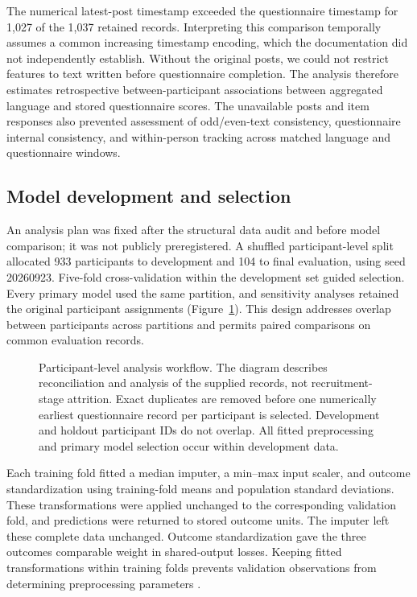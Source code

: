 The numerical latest-post timestamp exceeded the questionnaire timestamp for 1,027 of the 1,037 retained records. Interpreting this comparison temporally assumes a common increasing timestamp encoding, which the documentation did not independently establish. Without the original posts, we could not restrict features to text written before questionnaire completion. The analysis therefore estimates retrospective between-participant associations between aggregated language and stored questionnaire scores. The unavailable posts and item responses also prevented assessment of odd/even-text consistency, questionnaire internal consistency, and within-person tracking across matched language and questionnaire windows.

\subsection{Model development and selection}
An analysis plan was fixed after the structural data audit and before model comparison; it was not publicly preregistered. A shuffled participant-level split allocated 933 participants to development and 104 to final evaluation, using seed 20260923. Five-fold cross-validation within the development set guided selection. Every primary model used the same partition, and sensitivity analyses retained the original participant assignments (Figure~\ref{fig:flow}). This design addresses overlap between participants across partitions and permits paired comparisons on common evaluation records.

\begin{figure}[!htbp]
\centering
\caption{Participant-level analysis workflow. The diagram describes reconciliation and analysis of the supplied records, not recruitment-stage attrition. Exact duplicates are removed before one numerically earliest questionnaire record per participant is selected. Development and holdout participant IDs do not overlap. All fitted preprocessing and primary model selection occur within development data.}\label{fig:flow}
\end{figure}

Each training fold fitted a median imputer, a min--max input scaler, and outcome standardization using training-fold means and population standard deviations. These transformations were applied unchanged to the corresponding validation fold, and predictions were returned to stored outcome units. The imputer left these complete data unchanged. Outcome standardization gave the three outcomes comparable weight in shared-output losses. Keeping fitted transformations within training folds prevents validation observations from determining preprocessing parameters \citep{kapoor2023}.

